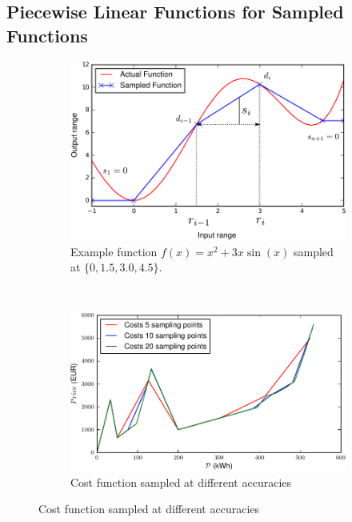 \documentclass[conference]{IEEEtran}
\begin{document}
\subsection{Piecewise Linear Functions for Sampled Functions}

\begin{figure}
        \centering
        \begin{subfigure}[b]{0.4\textwidth}
      \centering
      	\includegraphics[width=\textwidth]{img/piecewiselin.pdf}
      	\caption{Example function $f(x) = x^2 + 3 x \sin(x)$ sampled at $\{0, 1.5, 3.0, 4.5\}$.  }
      	\label{fig:pwlFunction}
        \end{subfigure}%
        ~ \qquad%
        \begin{subfigure}[b]{0.4\textwidth}
        \centering
        \includegraphics[width=\textwidth]{img/costs.pdf}
        \caption{Cost function sampled at different accuracies }
        \label{fig:costsFunction}
        \end{subfigure}
\end{figure}
\end{document}

